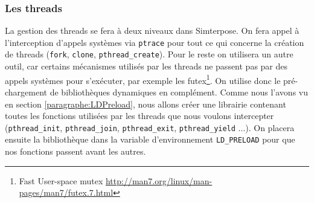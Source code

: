 \subsubsection{Les threads}
\label{section:threads}

La gestion des threads se fera à deux niveaux dans Simterpose. On fera appel à l'interception d'appels systèmes via \texttt{ptrace} pour tout ce qui concerne la création de threads (\texttt{fork}, \texttt{clone}, \texttt{pthread\_create}). Pour le reste on utilisera un autre outil, car certains mécanismes utilisés par les threads ne passent pas par des appels systèmes pour s'exécuter, par exemple les futex\footnote{Fast User-space mutex \url{http://man7.org/linux/man-pages/man7/futex.7.html}}. On utilise donc le pré-chargement de bibliothèques dynamiques en complément. Comme nous l'avons vu en section \ref{paragraphe:LDPreload}, nous allons créer une librairie contenant toutes les fonctions utilisées par les threads que nous voulons intercepter (\texttt{pthread\_init}, \texttt{pthread\_join}, \texttt{pthread\_exit}, \texttt{pthread\_yield} ...). On placera ensuite la bibliothèque dans la variable d'environnement \texttt{LD\_PRELOAD} pour que nos fonctions passent avant les autres.


